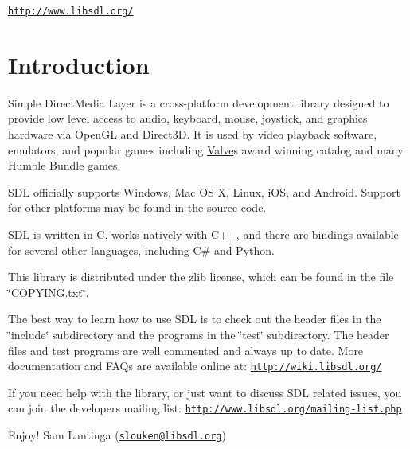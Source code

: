 \href{http://www.libsdl.org/}{\tt http\+://www.\+libsdl.\+org/}\hypertarget{index_intro_sec}{}\section{Introduction}\label{index_intro_sec}
Simple Direct\+Media Layer is a cross-\/platform development library designed to provide low level access to audio, keyboard, mouse, joystick, and graphics hardware via Open\+G\+L and Direct3\+D. It is used by video playback software, emulators, and popular games including \hyperlink{namespaceValve}{Valve}\textquotesingle{}s award winning catalog and many Humble Bundle games.

S\+D\+L officially supports Windows, Mac O\+S X, Linux, i\+O\+S, and Android. Support for other platforms may be found in the source code.

S\+D\+L is written in C, works natively with C++, and there are bindings available for several other languages, including C\# and Python.

This library is distributed under the zlib license, which can be found in the file \char`\"{}\+C\+O\+P\+Y\+I\+N\+G.\+txt\char`\"{}.

The best way to learn how to use S\+D\+L is to check out the header files in the \char`\"{}include\char`\"{} subdirectory and the programs in the \char`\"{}test\char`\"{} subdirectory. The header files and test programs are well commented and always up to date. More documentation and F\+A\+Qs are available online at\+: \href{http://wiki.libsdl.org/}{\tt http\+://wiki.\+libsdl.\+org/}

If you need help with the library, or just want to discuss S\+D\+L related issues, you can join the developers mailing list\+: \href{http://www.libsdl.org/mailing-list.php}{\tt http\+://www.\+libsdl.\+org/mailing-\/list.\+php}

Enjoy! Sam Lantinga (\href{mailto:slouken@libsdl.org}{\tt slouken@libsdl.\+org}) 